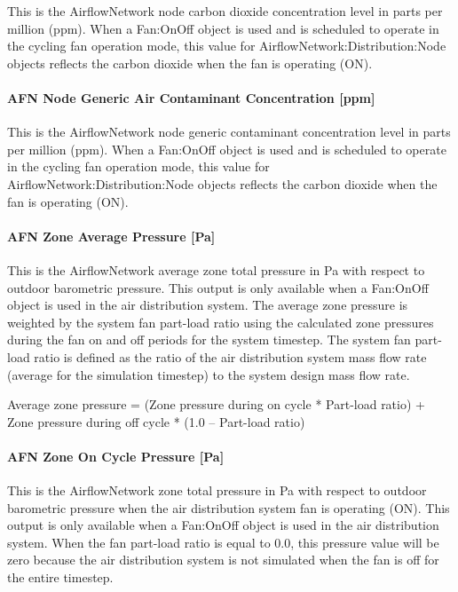 This is the AirflowNetwork node carbon dioxide concentration level in parts per million (ppm). When a Fan:OnOff object is used and is scheduled to operate in the cycling fan operation mode, this value for AirflowNetwork:Distribution:Node objects reflects the carbon dioxide when the fan is operating (ON).

\paragraph{AFN Node Generic Air Contaminant Concentration {[}ppm{]}}\label{afn-node-generic-air-contaminant-concentration-ppm}

This is the AirflowNetwork node generic contaminant concentration level in parts per million (ppm). When a Fan:OnOff object is used and is scheduled to operate in the cycling fan operation mode, this value for AirflowNetwork:Distribution:Node objects reflects the carbon dioxide when the fan is operating (ON).

\paragraph{AFN Zone Average Pressure {[}Pa{]}}\label{afn-zone-average-pressure-pa}

This is the AirflowNetwork average zone total pressure in Pa with respect to outdoor barometric pressure. This output is only available when a Fan:OnOff object is used in the air distribution system. The average zone pressure is weighted by the system fan part-load ratio using the calculated zone pressures during the fan on and off periods for the system timestep. The system fan part-load ratio is defined as the ratio of the air distribution system mass flow rate (average for the simulation timestep) to the system design mass flow rate.

Average zone pressure = (Zone pressure during on cycle * Part-load ratio) + Zone pressure during off cycle * (1.0 -- Part-load ratio)

\paragraph{AFN Zone On Cycle Pressure {[}Pa{]}}\label{afn-zone-on-cycle-pressure-pa}

This is the AirflowNetwork zone total pressure in Pa with respect to outdoor barometric pressure when the air distribution system fan is operating (ON). This output is only available when a Fan:OnOff object is used in the air distribution system. When the fan part-load ratio is equal to 0.0, this pressure value will be zero because the air distribution system is not simulated when the fan is off for the entire timestep.

